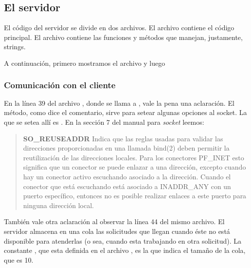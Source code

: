 \subsection{El servidor}

El código del servidor se divide en dos archivos. El archivo
 contiene el código principal. El archivo
 contiene las funciones y métodos que manejan, justamente,
strings.

A continuación, primero mostramos el archivo  y luego



\subsubsection{Comunicación con el cliente}

En la línea 39 del archivo , donde se llama a
, vale la pena una aclaración. El método, como dice el
comentario, sirve para setear algunas opciones al socket. La que se setea allí
es . En la sección 7 del manual para \emph{socket}
leemos:

\begin{quote}

\textbf{SO\_REUSEADDR}\linebreak
Indica que las reglas usadas para validar las direcciones proporcionadas en una
llamada bind(2) deben permitir la reutilización  de  las direcciones  locales.
Para  los conectores PF\_INET esto significa que un conector se puede enlazar a
una dirección, excepto cuando hay un conector activo escuchando asociado a la
dirección. Cuando el conector que está escuchando está asociado a INADDR\_ANY
con un puerto específico, entonces no es posible realizar enlaces a este puerto
para ninguna dirección local.

\end{quote}

También vale otra aclaración al observar la línea 44 del mismo archivo. El
servidor almacena en una cola las solicitudes que llegan cuando éste no está
disponible para atenderlas (o sea, cuando esta trabajando en otra solicitud).
La constante , que esta definida en el archivo
, es la que indica el tamaño de la cola, que es 10.

